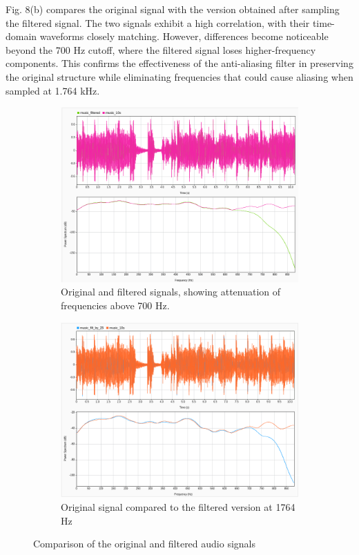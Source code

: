\documentclass[12pt]{article}
\begin{document}
Fig. 8(b) compares the original signal with the version obtained after sampling the filtered signal. The two signals exhibit a high correlation, with their time-domain waveforms closely matching. However, differences become noticeable beyond the 700 Hz cutoff, where the filtered signal loses higher-frequency components. This confirms the effectiveness of the anti-aliasing filter in preserving the original structure while eliminating frequencies that could cause aliasing when sampled at 1.764 kHz.
\FloatBarrier
\begin{figure}[htbp]
  \centering
  \begin{subfigure}[b]{0.48\textwidth} %
    \includegraphics[width=\linewidth]{labs/lab1/lab-report-tex/figures/SigAnalyzer/PArt C/ps_mus_filt_orig.png}
    \caption{Original and filtered signals, showing attenuation of frequencies above 700 Hz.}
    \label{fig:f2}
  \end{subfigure}
  \begin{subfigure}[b]{0.48\textwidth} %
    \includegraphics[width=\linewidth]{labs/lab1/lab-report-tex/figures/SigAnalyzer/PArt C/filt25_origi.png}
    \caption{Original signal compared to the filtered version at 1764 Hz}
    \label{fig:f2}
  \end{subfigure}
  \caption{Comparison of the original and filtered audio signals}
\end{figure}
\end{document}
